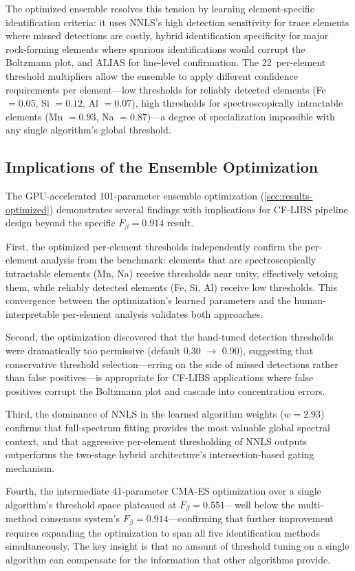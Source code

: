 The optimized ensemble resolves this tension by learning element-specific identification criteria: it uses NNLS's high detection sensitivity for trace elements where missed detections are costly, hybrid identification specificity for major rock-forming elements where spurious identifications would corrupt the Boltzmann plot, and ALIAS for line-level confirmation.
The 22~per-element threshold multipliers allow the ensemble to apply different confidence requirements per element---low thresholds for reliably detected elements (Fe $= 0.05$, Si $= 0.12$, Al $= 0.07$), high thresholds for spectroscopically intractable elements (Mn $= 0.93$, Na $= 0.87$)---a degree of specialization impossible with any single algorithm's global threshold.

\subsection{Implications of the Ensemble Optimization}

The GPU-accelerated 101-parameter ensemble optimization (\cref{sec:results-optimized}) demonstrates several findings with implications for CF-LIBS pipeline design beyond the specific $F_{\beta} = 0.914$ result.

First, the optimized per-element thresholds independently confirm the per-element analysis from the benchmark: elements that are spectroscopically intractable elements (Mn, Na) receive thresholds near unity, effectively vetoing them, while reliably detected elements (Fe, Si, Al) receive low thresholds.
This convergence between the optimization's learned parameters and the human-interpretable per-element analysis validates both approaches.

Second, the optimization discovered that the hand-tuned detection thresholds were dramatically too permissive (default 0.30 $\to$ 0.90), suggesting that conservative threshold selection---erring on the side of missed detections rather than false positives---is appropriate for CF-LIBS applications where false positives corrupt the Boltzmann plot and cascade into concentration errors.

Third, the dominance of NNLS in the learned algorithm weights ($w = 2.93$) confirms that full-spectrum fitting provides the most valuable global spectral context, and that aggressive per-element thresholding of NNLS outputs outperforms the two-stage hybrid architecture's intersection-based gating mechanism.

Fourth, the intermediate 41-parameter CMA-ES optimization over a single algorithm's threshold space plateaued at $F_{\beta} = 0.551$---well below the multi-method consensus system's $F_{\beta} = 0.914$---confirming that further improvement requires expanding the optimization to span all five identification methods simultaneously.
The key insight is that no amount of threshold tuning on a single algorithm can compensate for the information that other algorithms provide.

